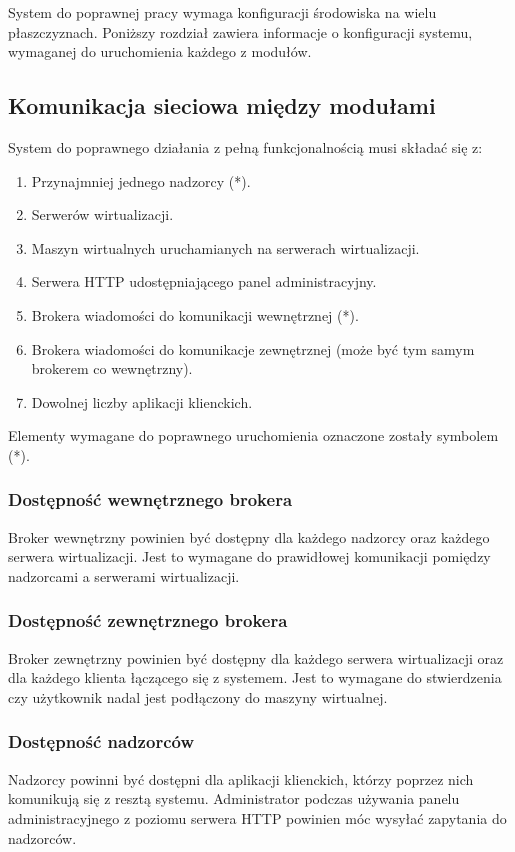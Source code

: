 \documentclass[../opis-rozwiazania.tex]{subfiles}
\begin{document}
\label{system_requirements}

System do poprawnej pracy wymaga konfiguracji środowiska na wielu płaszczyznach. Poniższy rozdział zawiera informacje o konfiguracji systemu, wymaganej do uruchomienia każdego z modułów.

\subsection{Komunikacja sieciowa między modułami}
System do poprawnego działania z pełną funkcjonalnością musi składać się z:
\begin{enumerate}
	\item Przynajmniej jednego nadzorcy (*).
	\item Serwerów wirtualizacji.
	\item Maszyn wirtualnych uruchamianych na serwerach wirtualizacji.
	\item Serwera HTTP udostępniającego panel administracyjny.
	\item Brokera wiadomości do komunikacji wewnętrznej (*).
	\item Brokera wiadomości do komunikacje zewnętrznej (może być tym samym brokerem co wewnętrzny).
	\item Dowolnej liczby aplikacji klienckich.
\end{enumerate}
Elementy wymagane do poprawnego uruchomienia oznaczone zostały symbolem (*).

\subsubsection{Dostępność wewnętrznego brokera}
Broker wewnętrzny powinien być dostępny dla każdego nadzorcy oraz każdego serwera wirtualizacji.
Jest to wymagane do prawidłowej komunikacji pomiędzy nadzorcami a serwerami wirtualizacji.

\subsubsection{Dostępność zewnętrznego brokera}
Broker zewnętrzny powinien być dostępny dla każdego serwera wirtualizacji oraz dla każdego klienta łączącego się z systemem.
Jest to wymagane do stwierdzenia czy użytkownik nadal jest podłączony do maszyny wirtualnej.

\subsubsection{Dostępność nadzorców}
Nadzorcy powinni być dostępni dla aplikacji klienckich, którzy poprzez nich komunikują się z resztą systemu.
Administrator podczas używania panelu administracyjnego z poziomu serwera HTTP powinien móc wysyłać zapytania do nadzorców.
\end{document}

